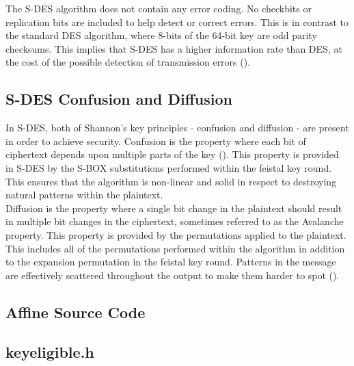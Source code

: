 \documentclass[]{article}
\begin{document}
The S-DES algorithm does not contain any error coding. No checkbits or replication bits are included to help detect or correct errors. This is in contrast to the standard DES algorithm, where 8-bits of the 64-bit key are odd parity checksums. This implies that S-DES has a higher information rate than DES, at the cost of the possible detection of transmission errors (\cite{alttext}).

\subsection*{S-DES Confusion and Diffusion}

In S-DES, both of Shannon's key principles - confusion and diffusion - are present in order to achieve security. Confusion is the property where each bit of ciphertext depends upon multiple parts of the key (\cite{maintext}). This property is provided in S-DES by the S-BOX substitutions performed within the feistal key round. This ensures that the algorithm is non-linear and solid in respect to destroying natural patterns within the plaintext.\\

 Diffusion is the property where a single bit change in the plaintext should result in multiple bit changes in the ciphertext, sometimes referred to as the Avalanche property. This property is provided by the permutations applied to the plaintext. This includes all of the permutations performed within the algorithm in addition to the expansion permutation in the feistal key round. Patterns in the message are effectively scattered throughout the output to make them harder to spot (\cite{alttext}).

\pagebreak


\vspace*{-0.8cm}
\begin{center}
	\section*{Affine Source Code}
\end{center}

\subsection*{keyeligible.h}
\pagebreak{}
\end{document}
